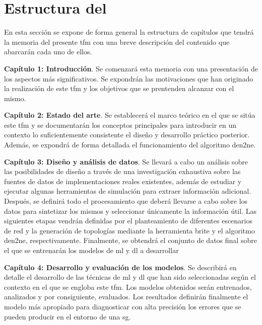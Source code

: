 \section{Estructura del }
\label{sec:structure}

En esta sección se expone de forma general la estructura de capítulos que tendrá la memoria del presente \gls{tfm} con una breve descripción del contenido que abarcarán cada uno de ellos.

\begin{description}
    \item\textbf{Capítulo 1: Introducción}. Se comenzará esta memoria con una presentación de los aspectos más significativos. Se expondrán las motivaciones que han originado la realización de este \gls{tfm} y los objetivos que se prentenden alcanzar con el mismo.

    \item\textbf{Capítulo 2: Estado del arte}. Se establecerá el marco teórico en el que se sitúa este \gls{tfm} y se documentarán los conceptos principales para introducir en un contexto lo suficientemente consistente el diseño y desarrollo práctico posterior. Además, se expondrá de forma detallada el funcionamiento del algoritmo \gls{den2ne}.

    \item\textbf{Capítulo 3: Diseño y análisis de datos}. Se llevará a cabo un análisis sobre las posibilidades de diseño a través de una investigación exhaustiva sobre las fuentes de datos de implementaciones reales existentes, además de estudiar y ejecutar algunas herramientas de simulación para extraer información adicional. Después, se definirá todo el procesamiento que deberá llevarse a cabo sobre los datos para sintetizar los mismos y seleccionar únicamente la información útil. Las siguientes etapas vendrán definidas por el planteamiento de diferentes escenarios de red y la generación de topologías mediante la herramienta \gls{brite} y el algoritmo {den2ne}, respectivamente. Finalmente, se obtendrá el conjunto de datos final sobre el que se entrenarán los modelos de \gls{ml} y \gls{dl} a desarrollar  

    \item\textbf{Capítulo 4: Desarrollo y evaluación de los modelos}. Se describirá en detalle el desarrollo de las técnicas de \gls{ml} y \gls{dl} que han sido seleccionadas según el contexto en el que se engloba este \gls{tfm}. Los modelos obtenidos serán entrenados, analizados y por consiguiente, evaluados. Los resultados definirán finalmente el modelo más apropiado para diagnosticar con alta precisión los errores que se pueden producir en el entorno de una \gls{sg}.
    

\end{description}
